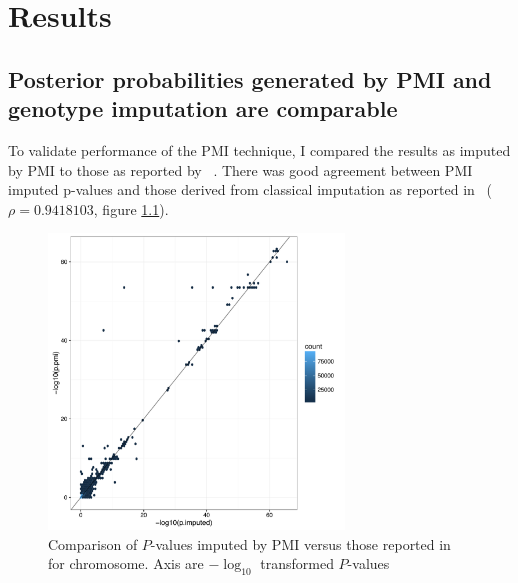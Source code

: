\documentclass[a4paper,11pt]{report}
\begin{document}


\chapter{Results}

\section{Posterior probabilities generated by PMI and genotype imputation are comparable}

To validate performance of the PMI technique, I compared the results as imputed by PMI to those as reported by  ~\citep{Okada2014-um}. There was good agreement between PMI imputed p-values and those derived from classical imputation as reported in~\citet{Okada2014-um} ($\rho=0.9418103$, figure \ref{fig:pmi_comparison}). %

\begin{figure}[h]
\centering
\includegraphics[width=0.7\textwidth]{pmi_vs_imp.pdf}
\caption{Comparison of $P$-values imputed by PMI versus those reported in ~\citep{Okada2014-um} for chromosome. Axis are $-\log_{10}$ transformed $P$-values}
\label{fig:pmi_comparison}
\end{figure}
\end{document}
